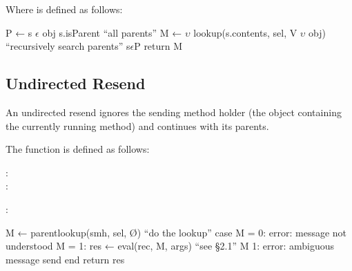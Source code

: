 \documentclass[letterpaper,10pt,english]{sphinxmanual}
\begin{document}
Where  is defined as follows:

\begin{sphinxVerbatim}[commandchars=\\\{\}]
P ← \PYGZob{}s \(\epsilon\) obj \textbar{} s.isParent\PYGZcb{}                  “all parents”
M ← \(\upsilon\) lookup(s.contents, sel, V \(\upsilon\) \PYGZob{}obj\PYGZcb{})    “recursively search parents”
   s\(\epsilon\)P
return M
\end{sphinxVerbatim}


\subsection{Undirected Resend}
\label{\detokenize{langref:pp-undirected-resend}}\label{\detokenize{langref:undirected-resend}}
An undirected resend ignores the sending method holder (the object containing the currently running method) and continues with its parents.

The function  is defined as follows:
\begin{description}
\item[{:}] \leavevmode
{}

\item[{:}] \leavevmode
{}

\end{description}

:

\begin{sphinxVerbatim}[commandchars=\\\{\}]
M ← parent\PYGZus{}lookup(smh, sel, Ø)                    “do the lookup”
case
    \textbar{} M \textbar{} = 0: error: message not understood
    \textbar{} M \textbar{} = 1: res ← eval(rec, M, args)           “see \S{}2.1”
    \textbar{} M \textbar{} \PYGZgt{} 1: error: ambiguous message send
end
return res
\end{sphinxVerbatim}
\end{document}
